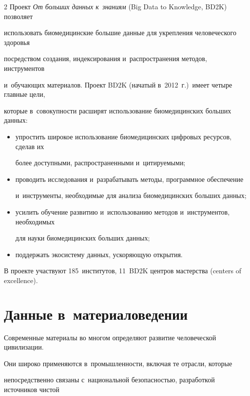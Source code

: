 \begin{multicols}{2}
  Проект \textit{От больших данных к~знаниям} (Big Data to Knowledge, BD2K) позволяет 


использовать биомедицинские большие данные для укрепления человеческого здоровья 


посредством создания, индексирования и~распространения методов, инструментов 


и~обучающих материалов. Проект BD2K (начатый в~2012~г.)\ имеет четыре главные цели, 


которые в~совокупности расширят использование биомедицинских больших данных:


  \begin{itemize}


\item упростить широкое использование биомедицинских цифровых ресурсов, сделав их 


более доступными, распространенными и~цити\-ру\-емыми;


\item проводить исследования и~разрабатывать методы, программное обеспечение 


и~инструменты, необходимые для анализа биомедицинских больших данных;


\item усилить обучение развитию и~использованию методов и~инструментов, необходимых 


для нау\-ки биомедицинских больших данных;


\item поддержать экосистему данных, ускоряющую открытия.


\end{itemize}





В проекте участвуют 185~институтов, 11~BD2K центров мастерства (centers of excellence).





\section{Данные в~материаловедении}





  Современные материалы во многом определяют развитие человеческой цивилизации. 


Они широко применяются в~промышленности, включая те отрасли, которые 


непосредственно связаны с~национальной безопасностью, разработкой источников чис\-той 



\end{multicols}
